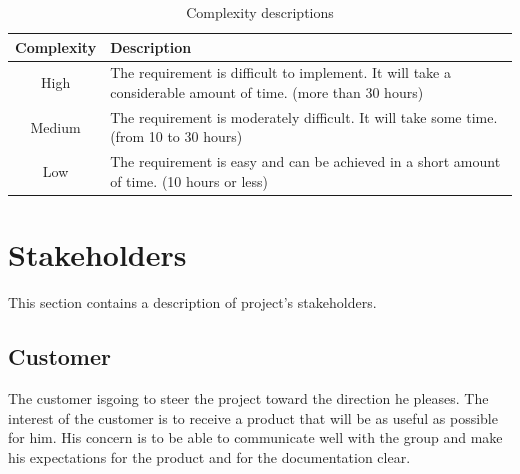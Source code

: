 \begin{table}[H]
\begin{center}
\begin{tabular}{ | c | p{12.5cm} | }
  \hline
  Complexity & Description \\
  \hline\noalign{\smallskip}\noalign{\smallskip}\hline
  High & The requirement is difficult to implement.\newline
  It will take a considerable amount of time. (more than 30 hours) \\
  Medium & The requirement is moderately difficult.\newline
  It will take some time. (from 10 to 30 hours) \\
  Low & The requirement is easy and can be achieved\newline
  in a short amount of time. (10 hours or less) \\
  \hline
\end{tabular}
\end{center}
\caption{Complexity descriptions}
\label{table:complexity}
\end{table}



\section{Stakeholders}
\label{section:stakeholders}

This section contains a description of project's stakeholders.

\subsection{Customer}
The customer isgoing to steer the project toward the direction he pleases.
The interest of the customer is to receive a product that will be as useful as possible for him.
His concern is to be able to communicate well with the group and make his expectations for the product
and for the documentation clear.

